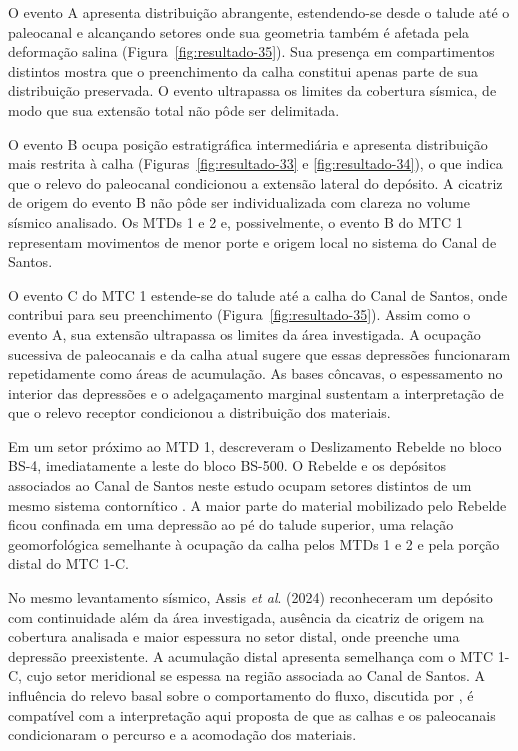O evento A apresenta distribuição abrangente, estendendo-se desde o talude até o paleocanal e alcançando setores onde sua geometria também é afetada pela deformação salina (Figura~\ref{fig:resultado-35}). Sua presença em compartimentos distintos mostra que o preenchimento da calha constitui apenas parte de sua distribuição preservada. O evento ultrapassa os limites da cobertura sísmica, de modo que sua extensão total não pôde ser delimitada.

O evento B ocupa posição estratigráfica intermediária e apresenta distribuição mais restrita à calha (Figuras~\ref{fig:resultado-33} e \ref{fig:resultado-34}), o que indica que o relevo do paleocanal condicionou a extensão lateral do depósito. A cicatriz de origem do evento B não pôde ser individualizada com clareza no volume sísmico analisado. Os MTDs 1 e 2 e, possivelmente, o evento B do MTC 1 representam movimentos de menor porte e origem local no sistema do Canal de Santos.

O evento C do MTC 1 estende-se do talude até a calha do Canal de Santos, onde contribui para seu preenchimento (Figura~\ref{fig:resultado-35}). Assim como o evento A, sua extensão ultrapassa os limites da área investigada. A ocupação sucessiva de paleocanais e da calha atual sugere que essas depressões funcionaram repetidamente como áreas de acumulação. As bases côncavas, o espessamento no interior das depressões e o adelgaçamento marginal sustentam a interpretação de que o relevo receptor condicionou a distribuição dos materiais.

Em um setor próximo ao MTD 1,  descreveram o Deslizamento Rebelde no bloco BS-4, imediatamente a leste do bloco BS-500. O Rebelde e os depósitos associados ao Canal de Santos neste estudo ocupam setores distintos de um mesmo sistema contornítico \cite{dutra2019}. A maior parte do material mobilizado pelo Rebelde ficou confinada em uma depressão ao pé do talude superior, uma relação geomorfológica semelhante à ocupação da calha pelos MTDs 1 e 2 e pela porção distal do MTC 1-C.

No mesmo levantamento sísmico, Assis\textit{ et al}. (2024) reconheceram um depósito com continuidade além da área investigada, ausência da cicatriz de origem na cobertura analisada e maior espessura no setor distal, onde preenche uma depressão preexistente. A acumulação distal apresenta semelhança com o MTC 1-C, cujo setor meridional se espessa na região associada ao Canal de Santos. A influência do relevo basal sobre o comportamento do fluxo, discutida por , é compatível com a interpretação aqui proposta de que as calhas e os paleocanais condicionaram o percurso e a acomodação dos materiais.

